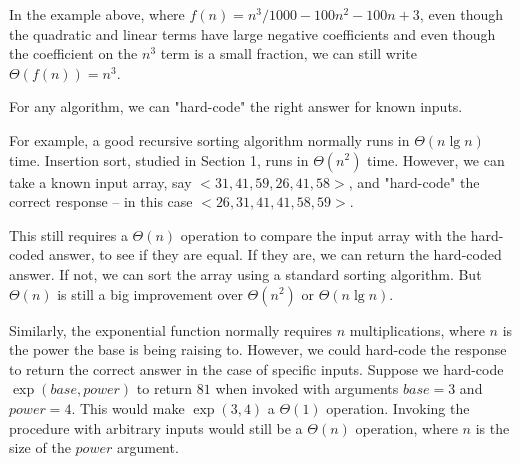 \documentclass[a4paper,12pt]{article}
\begin{document}
In the example above, where $f(n) = n^3/1000 - 100n^2 - 100n + 3$, even though the quadratic and linear
terms have large negative coefficients and even though the coefficient on the $n^3$ term is a small fraction,
we can still write $\Theta(f(n)) = n^3$.

\vspace{5mm}


For any algorithm, we can "hard-code" the right answer for known inputs. 

For example, a good recursive sorting algorithm normally runs in $\Theta(n \lg n)$ time. Insertion sort, 
studied in Section 1, runs in $\Theta(n^2)$ time. However, we can take a known input array, say 
$<31, 41, 59, 26, 41, 58>$, and "hard-code" the correct response -- in this case $<26, 31, 41, 41, 58, 59>$.

This still requires a $\Theta(n)$ operation to compare the input array with the hard-coded 
answer, to see if they are equal. If they are, we can return the hard-coded answer. If not, we can 
sort the array using a standard sorting algorithm. But $\Theta(n)$ is still a big improvement over $\Theta(n^2)$ or $\Theta(n \lg n)$. 

Similarly, the exponential function normally requires $n$ multiplications, where $n$ is the power the base 
is being raising to. However, we could hard-code the response to return the correct answer in the case of 
specific inputs. Suppose we hard-code $\exp(base, power)$ to return $81$ when invoked with arguments $base=3$ and $power=4$.
This would make $\exp(3,4)$ a $\Theta(1)$ operation. Invoking the procedure with arbitrary inputs
would still be a $\Theta(n)$ operation, where $n$ is the size of the $power$ argument.
\end{document}
